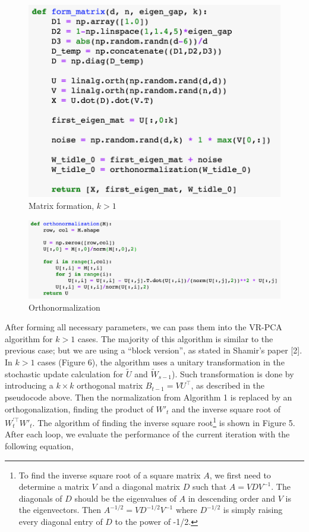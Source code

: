 \documentclass{article}
\begin{document}
\begin{figure}[H]
    \centering
    \includegraphics[scale=0.5]{./form_matrix2.png}
    \caption{Matrix formation, $k>1$}
\end{figure}
\begin{figure}[H]
    \centering
    \includegraphics[scale=0.5]{./orthonormalization.png}
    \caption{Orthonormalization}
\end{figure}
After forming all necessary parameters, we can pass them into the VR-PCA algorithm for $k>1$ cases. The majority of this algorithm is similar to the previous case; but we are using a “block version”, as stated in Shamir’s paper [2]. In $k>1$ cases (Figure 6), the algorithm uses a unitary transformation in the stochastic update calculation for $\tilde{U}$ and $\tilde{W}_{s-1}$). Such transformation is done by introducing a $k\times k$ orthogonal matrix $B_{t-1}=VU^\top$, as described in the pseudocode above. Then the normalization from Algorithm 1 is replaced by an orthogonalization, finding the product of $W'_t$ and the inverse square root of $W_t^{'\top}W'_t$. The algorithm of finding the inverse square root\footnote{To find the inverse square root of a square matrix $A$, we first need to determine a matrix $V$ and a diagonal matrix $D$ such that $A=VDV^{-1}$. The diagonals of $D$ should be the eigenvalues of $A$ in descending order and $V$ is the eigenvectors. Then $A^{-1/2}=VD^{-1/2}V^{-1}$ where $D^{-1/2}$ is simply raising every diagonal entry of $D$ to the power of -1/2. } is shown in Figure 5. After each loop, we evaluate the performance of the current iteration with the following equation, 
\end{document}
